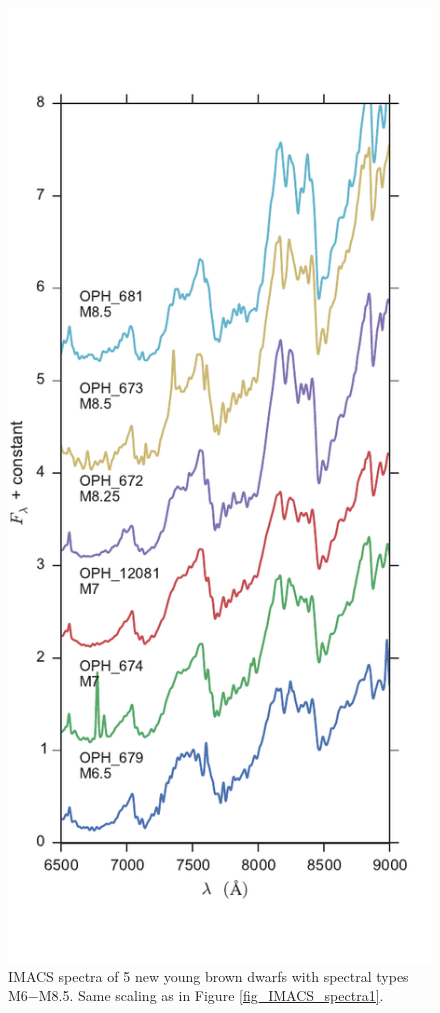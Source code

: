 \begin{figure}[ht!]
\caption{IMACS spectra of 5 new young brown dwarfs with spectral types M6$-$M8.5.  Same scaling as in Figure \ref{fig_IMACS_spectra1}. \label{fig_IMACS_spectra2} }
\centering
\includegraphics[scale=0.65]{chIMACS/figures/IMACS_spectra_M6_M8p5}
\end{figure}

